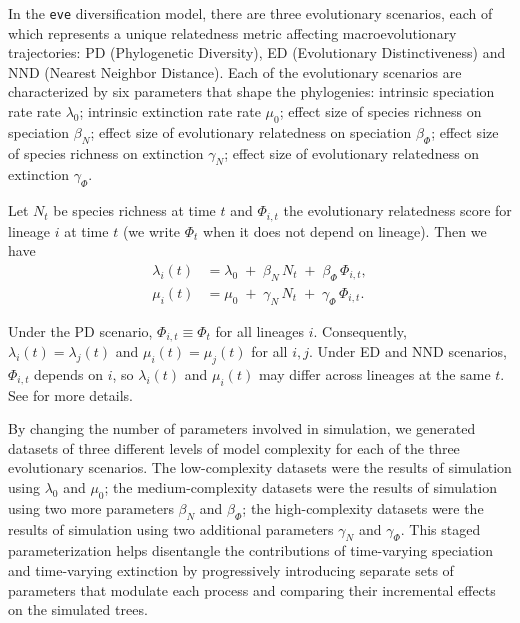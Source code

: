 {In the \texttt{eve} diversification model, there are three evolutionary scenarios, each of which represents a unique relatedness metric affecting macroevolutionary trajectories: PD (Phylogenetic Diversity), ED (Evolutionary Distinctiveness) and NND (Nearest Neighbor Distance). Each of the evolutionary scenarios are characterized by six parameters that shape the phylogenies: intrinsic speciation rate rate $\lambda_0$; intrinsic extinction rate rate $\mu_0$; effect size of species richness on speciation $\beta_N$; effect size of evolutionary relatedness on speciation $\beta_\varPhi$; effect size of species richness on extinction $\gamma_N$; effect size of evolutionary relatedness on extinction $\gamma_\varPhi$. 

Let \(N_t\) be species richness at time \(t\) and \(\varPhi_{i,t}\) the
evolutionary relatedness score for lineage \(i\) at time \(t\)
(we write \(\varPhi_t\) when it does not depend on lineage). Then we have
\begin{align}
\lambda_i(t)
  &= \lambda_0 \;+\; \beta_{N}\,N_t \;+\; \beta_{\varPhi}\,\varPhi_{i,t}, \\
\mu_i(t)
  &= \mu_0 \;+\; \gamma_{N}\,N_t \;+\; \gamma_{\varPhi}\,\varPhi_{i,t}.
\end{align}

Under the PD scenario, \(\varPhi_{i,t}\equiv \varPhi_t\) for all lineages \(i\). Consequently, \(\lambda_i(t)=\lambda_j(t)\) and \(\mu_i(t)=\mu_j(t)\) for all \(i,j\). Under ED and NND scenarios, \(\varPhi_{i,t}\) depends on \(i\), so \(\lambda_i(t)\) and \(\mu_i(t)\) may differ across lineages at the same \(t\). See \citet{qin_impact_2025} for more details. 

By changing the number of parameters involved in simulation, we generated datasets of three different levels of model complexity for each of the three evolutionary scenarios. The low-complexity datasets were the results of simulation using $\lambda_0$ and $\mu_0$; the medium-complexity datasets were the results of simulation using two more parameters $\beta_N$ and $\beta_\varPhi$; the high-complexity datasets were the results of simulation using two additional parameters $\gamma_N$ and $\gamma_\varPhi$. This staged parameterization helps disentangle the contributions of time-varying speciation and time-varying extinction by progressively introducing separate sets of parameters that modulate each process and comparing their incremental effects on the simulated trees.

}
